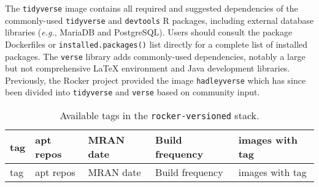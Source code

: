 The \texttt{tidyverse} image contains all required and suggested
dependencies of the commonly-used \texttt{tidyverse} and
\texttt{devtools} R packages, including external database libraries
(\emph{e.g.}, MariaDB and PostgreSQL). Users should consult the package
Dockerfiles or \texttt{installed.packages()} list directly for a
complete list of installed packages. The \texttt{verse} library adds
commonly-used dependencies, notably a large but not comprehensive LaTeX
environment and Java development libraries. Previously, the Rocker
project provided the image \texttt{hadleyverse} which has since been
divided into \texttt{tidyverse} and \texttt{verse} based on community
input.

\begin{longtable}[]{@{}lllll@{}}
\caption{Available tags in the \texttt{rocker-versioned}
stack.}\tabularnewline
\toprule
\begin{minipage}[b]{0.09\columnwidth}\raggedright\strut
tag\strut
\end{minipage} & \begin{minipage}[b]{0.12\columnwidth}\raggedright\strut
apt repos\strut
\end{minipage} & \begin{minipage}[b]{0.15\columnwidth}\raggedright\strut
MRAN date\strut
\end{minipage} & \begin{minipage}[b]{0.19\columnwidth}\raggedright\strut
Build frequency\strut
\end{minipage} & \begin{minipage}[b]{0.32\columnwidth}\raggedright\strut
images with tag\strut
\end{minipage}\tabularnewline
\midrule
\endfirsthead
\toprule
\begin{minipage}[b]{0.09\columnwidth}\raggedright\strut
tag\strut
\end{minipage} & \begin{minipage}[b]{0.12\columnwidth}\raggedright\strut
apt repos\strut
\end{minipage} & \begin{minipage}[b]{0.15\columnwidth}\raggedright\strut
MRAN date\strut
\end{minipage} & \begin{minipage}[b]{0.19\columnwidth}\raggedright\strut
Build frequency\strut
\end{minipage} & \begin{minipage}[b]{0.32\columnwidth}\raggedright\strut
images with tag\strut
\end{minipage}\tabularnewline

\end{longtable}
